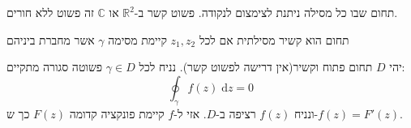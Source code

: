 \documentclass{tstextbook}
\begin{document}
\begin{definition}
תחום שבו כל מסילה ניתנת לצימצום לנקודה. פשוט קשר ב-\(\mathbb{R}^2\) או \(\mathbb{C}\) זה פשוט ללא חורים.

\end{definition}
\begin{definition}
תחום הוא קשיר מסילתית אם לכל \(z_{1},z_{2}\) קיימת מסימה \(\gamma\) אשר מחברת ביניהם

\end{definition}
\begin{theorem}[ מוררה]
יהי \(D\) תחום פתוח וקשיר(אין דרישה לפשוט קשר). נניח לכל \(\gamma \in D\) פשוטה סגורה מתקיים:
$$\oint_{\gamma} f(z)\;\mathrm{d}z=0$$
ונניח \(f(z)\) רציפה ב-\(D\). אזי ל-\(f\) קיימת פונקציה קדומה \(F(z)\) כך ש-\(f(z)=F'(z)\).

\end{theorem}
\end{document}
